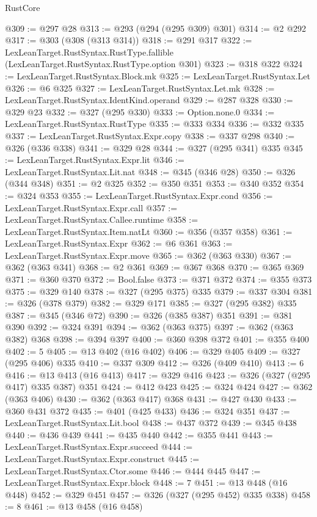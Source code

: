 \begin{lexlean}{RustCore}
\begin{coremodule}
@309 := @297 @28
@313 := @293 (@294 (@295 @309) @301)
@314 := @2 @292
@317 := @303 (@308 (@313 @314))
@318 := @291 @317
@322 := LexLeanTarget.RustSyntax.RustType.fallible (LexLeanTarget.RustSyntax.RustType.option @301)
@323 := @318 @322
@324 := LexLeanTarget.RustSyntax.Block.mk
@325 := LexLeanTarget.RustSyntax.Let
@326 := @6 @325
@327 := LexLeanTarget.RustSyntax.Let.mk
@328 := LexLeanTarget.RustSyntax.IdentKind.operand
@329 := @287 @328
@330 := @329 @23
@332 := @327 (@295 @330)
@333 := Option.none.{0}
@334 := LexLeanTarget.RustSyntax.RustType
@335 := @333 @334
@336 := @332 @335
@337 := LexLeanTarget.RustSyntax.Expr.copy
@338 := @337 @298
@340 := @326 (@336 @338)
@341 := @329 @28
@344 := @327 (@295 @341) @335
@345 := LexLeanTarget.RustSyntax.Expr.lit
@346 := LexLeanTarget.RustSyntax.Lit.nat
@348 := @345 (@346 @28)
@350 := @326 (@344 @348)
@351 := @2 @325
@352 := @350 @351
@353 := @340 @352
@354 := @324 @353
@355 := LexLeanTarget.RustSyntax.Expr.cond
@356 := LexLeanTarget.RustSyntax.Expr.call
@357 := LexLeanTarget.RustSyntax.Callee.runtime
@358 := LexLeanTarget.RustSyntax.Item.natLt
@360 := @356 (@357 @358)
@361 := LexLeanTarget.RustSyntax.Expr
@362 := @6 @361
@363 := LexLeanTarget.RustSyntax.Expr.move
@365 := @362 (@363 @330)
@367 := @362 (@363 @341)
@368 := @2 @361
@369 := @367 @368
@370 := @365 @369
@371 := @360 @370
@372 := Bool.false
@373 := @371 @372
@374 := @355 @373
@375 := @329 @140
@378 := @327 (@295 @375) @335
@379 := @337 @304
@381 := @326 (@378 @379)
@382 := @329 @171
@385 := @327 (@295 @382) @335
@387 := @345 (@346 @72)
@390 := @326 (@385 @387) @351
@391 := @381 @390
@392 := @324 @391
@394 := @362 (@363 @375)
@397 := @362 (@363 @382) @368
@398 := @394 @397
@400 := @360 @398 @372
@401 := @355 @400
@402 := 5
@405 := @13 @402 (@16 @402)
@406 := @329 @405
@409 := @327 (@295 @406) @335
@410 := @337 @309
@412 := @326 (@409 @410)
@413 := 6
@416 := @13 @413 (@16 @413)
@417 := @329 @416
@423 := @326 (@327 (@295 @417) @335 @387) @351
@424 := @412 @423
@425 := @324 @424
@427 := @362 (@363 @406)
@430 := @362 (@363 @417) @368
@431 := @427 @430
@433 := @360 @431 @372
@435 := @401 (@425 @433)
@436 := @324 @351
@437 := LexLeanTarget.RustSyntax.Lit.bool
@438 := @437 @372
@439 := @345 @438
@440 := @436 @439
@441 := @435 @440
@442 := @355 @441
@443 := LexLeanTarget.RustSyntax.Expr.succeed
@444 := LexLeanTarget.RustSyntax.Expr.construct
@445 := LexLeanTarget.RustSyntax.Ctor.some
@446 := @444 @445
@447 := LexLeanTarget.RustSyntax.Expr.block
@448 := 7
@451 := @13 @448 (@16 @448)
@452 := @329 @451
@457 := @326 (@327 (@295 @452) @335 @338)
@458 := 8
@461 := @13 @458 (@16 @458)

\end{coremodule}
\end{lexlean}

